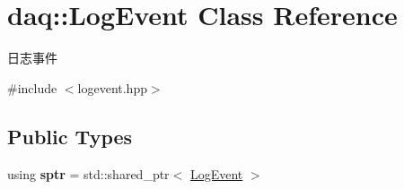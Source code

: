 \hypertarget{classdaq_1_1LogEvent}{}\section{daq\+:\+:Log\+Event Class Reference}
\label{classdaq_1_1LogEvent}


日志事件  




{\ttfamily \#include $<$logevent.\+hpp$>$}

\subsection*{Public Types}
\begin{DoxyCompactItemize}
\item 
\mbox{\label{classdaq_1_1LogEvent_ad02016fc3f4254ead31e411ffa8ffbac}} 
using {\bfseries sptr} = std\+::shared\+\_\+ptr$<$ \hyperlink{classdaq_1_1LogEvent}{Log\+Event} $>$
\end{DoxyCompactItemize}
